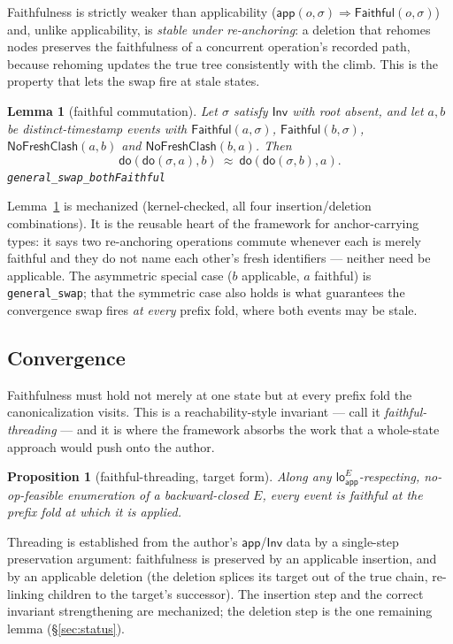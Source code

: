 \documentclass[11pt]{article}
\newtheorem{lemma}[theorem]{Lemma}
\newtheorem{proposition}[theorem]{Proposition}
\newcommand{\dolab}{\mathsf{do}}
\newcommand{\Inv}{\mathsf{Inv}}
\newcommand{\app}{\mathsf{app}}
\newcommand{\loA}[1]{\mathsf{lo}_{\!\app}^{#1}}
\newcommand{\eqobs}{\approx}
\newcommand{\lean}[1]{\texttt{\small #1}}
\newcommand{\faith}{\mathsf{Faithful}}
\newcommand{\nfc}{\mathsf{NoFreshClash}}
\begin{document}
Faithfulness is strictly weaker than applicability ($\app(o,\sigma)\Rightarrow
\faith(o,\sigma)$) and, unlike applicability, is \emph{stable under
re-anchoring}: a deletion that rehomes nodes preserves the faithfulness of a
concurrent operation's recorded path, because rehoming updates the true tree
consistently with the climb. This is the property that lets the swap fire at
stale states.

\begin{lemma}[faithful commutation]
\label{lem:swap}
Let $\sigma$ satisfy $\Inv$ with root absent, and let $a,b$ be distinct-timestamp
events with $\faith(a,\sigma)$, $\faith(b,\sigma)$, $\nfc(a,b)$ and $\nfc(b,a)$.
Then
\[
  \dolab(\dolab(\sigma,a),b)\ \eqobs\ \dolab(\dolab(\sigma,b),a).
\]
\hfill\lean{general\_swap\_bothFaithful}
\end{lemma}

Lemma~\ref{lem:swap} is mechanized (kernel-checked, all four
insertion/deletion combinations). It is the reusable heart of the framework for
anchor-carrying types: it says two re-anchoring operations commute whenever each
is merely faithful and they do not name each other's fresh identifiers ---
neither need be applicable. The asymmetric special case ($b$ applicable, $a$
faithful) is \lean{general\_swap}; that the symmetric case also holds is what
guarantees the convergence swap fires \emph{at every} prefix fold, where both
events may be stale.

\subsection{Convergence}

Faithfulness must hold not merely at one state but at every prefix fold the
canonicalization visits. This is a reachability-style invariant --- call it
\emph{faithful-threading} --- and it is where the framework absorbs the work that
a whole-state approach would push onto the author.

\begin{proposition}[faithful-threading, target form]
\label{prop:thread}
Along any $\loA{E}$-respecting, no-op-feasible enumeration of a backward-closed
$E$, every event is faithful at the prefix fold at which it is applied.
\end{proposition}

Threading is established from the author's $\app$/$\Inv$ data by a single-step
preservation argument: faithfulness is preserved by an applicable insertion, and
by an applicable deletion (the deletion splices its target out of the true chain,
re-linking children to the target's successor). The insertion step and the
correct invariant strengthening are mechanized; the deletion step is the one
remaining lemma (\S\ref{sec:status}).
\end{document}
